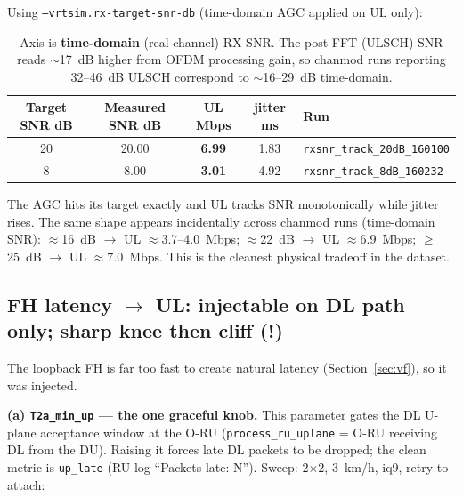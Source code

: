 \documentclass[11pt,a4paper]{article}
\newcommand{\warn}{\textcolor{orange!85!black}{\textbf{(!)}}}
\begin{document}
Using \texttt{--vrtsim.rx-target-snr-db} (time-domain AGC applied on UL only):

\begin{table}[h]\centering\small
\begin{tabular}{@{}c c c c l@{}}
\toprule
\textbf{Target SNR dB} & \textbf{Measured SNR dB} & \textbf{UL Mbps} & \textbf{jitter ms} & \textbf{Run} \\
\midrule
20 & 20.00 & \textbf{6.99} & 1.83 & \texttt{rxsnr\_track\_20dB\_160100} \\
8  & 8.00  & \textbf{3.01} & 4.92 & \texttt{rxsnr\_track\_8dB\_160232}  \\
\bottomrule
\end{tabular}
\caption*{\small Axis is \textbf{time-domain} (real channel) RX SNR. The post-FFT (ULSCH)
SNR reads $\sim$17~dB higher from OFDM processing gain, so chanmod runs reporting 32--46~dB
ULSCH correspond to $\sim$16--29~dB time-domain.}
\end{table}

The AGC hits its target exactly and UL tracks SNR monotonically while jitter rises.
The same shape appears incidentally across chanmod runs (time-domain SNR):
$\approx$16~dB $\rightarrow$ UL $\approx$3.7--4.0~Mbps;
$\approx$22~dB $\rightarrow$ UL $\approx$6.9~Mbps;
$\geq$25~dB $\rightarrow$ UL $\approx$7.0~Mbps.
This is the cleanest physical tradeoff in the dataset.

\subsection{FH latency $\rightarrow$ UL: injectable on DL path only; sharp knee then cliff
  \texorpdfstring{\warn}{[!]}}

The loopback FH is far too fast to create natural latency (Section~\ref{sec:vf}), so it was injected.

\textbf{(a) \texttt{T2a\_min\_up} --- the one graceful knob.}
This parameter gates the DL U-plane acceptance window at the O-RU
(\texttt{process\_ru\_uplane} = O-RU receiving DL from the DU). Raising it forces late DL
packets to be dropped; the clean metric is \texttt{up\_late} (RU log ``Packets late: N'').
Sweep: 2$\times$2, 3~km/h, iq9, retry-to-attach:
\end{document}
